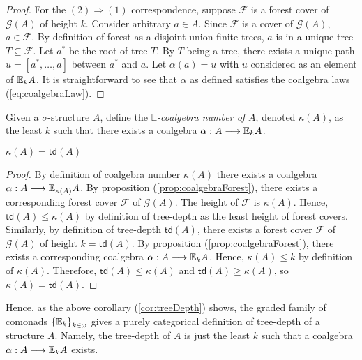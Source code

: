 \begin{prop}
\begin{proof}
For the $(2) \Rightarrow (1)$ correspondence, suppose $\mathcal{F}$ is a forest cover of $\mathcal{G}(A)$ of height $k$. Consider arbitrary $a \in A$. Since $\mathcal{F}$ is a cover of $\mathcal{G}(A)$, $a \in \mathcal{F}$. By definition of forest as a disjoint union finite trees, $a$ is in a unique tree $T \subseteq \mathcal{F}$. Let $a^{*}$ be the root of tree $T$. By $T$ being a tree, there exists a unique path $u = [a^{*},\dots,a]$ between $a^{*}$ and $a$. Let $\alpha(a) = u$ with $u$ considered as an element of ${\mathbb{E}_{k}A}$. It is straightforward to see that $\alpha$ as defined satisfies the coalgebra laws (\ref{eq:coalgebraLaw}). 
\end{proof}
\label{prop:coalgebraForest}
\begin{defn}
Given a $\sigma$-structure $A$, define the \textit{$\mathbb{E}$-coalgebra number of $A$}, denoted $\kappa(A)$, as the least $k$ such that there exists a coalgebra $\alpha:A \longrightarrow {\mathbb{E}_{k}A}$. 
\end{defn}
\begin{cor}
$\kappa(A) = \mathsf{td}(A)$
\begin{proof}
By definition of coalgebra number $\kappa(A)$ there exists a coalgebra $\alpha:A \longrightarrow {\mathbb{E}_{\kappa(A)}A}$. By proposition (\ref{prop:coalgebraForest}), there exists a corresponding forest cover $\mathcal{F}$ of $\mathcal{G}(A)$. The height of $\mathcal{F}$ is $\kappa(A)$. Hence, $\mathsf{td}(A) \leq \kappa(A)$ by definition of tree-depth as the least height of forest covers. Similarly, by definition of tree-depth $\mathsf{td}(A)$, there exists a forest cover $\mathcal{F}$ of $\mathcal{G}(A)$ of height $k = \mathsf{td}(A)$. By proposition (\ref{prop:coalgebraForest}), there exists a corresponding coalgebra $\alpha:A \longrightarrow {\mathbb{E}_{k}A}$. Hence, $\kappa(A) \leq k$ by definition of $\kappa(A)$. Therefore, $\mathsf{td}(A) \leq \kappa(A)$ and $\mathsf{td}(A) \geq \kappa(A)$, so $\kappa(A) = \mathsf{td}(A)$.      
\end{proof}
\label{cor:treeDepth}
\end{cor}
\end{prop}
Hence, as the above corollary (\ref{cor:treeDepth}) shows, the graded family of comonads $\{{\mathbb{E}_{k}\}}_{k \in \omega}$ gives a purely categorical definition of tree-depth of a structure $A$. Namely, the tree-depth of $A$ is just the least $k$ such that a coalgebra $\alpha:A \longrightarrow {\mathbb{E}_{k}A}$ exists. 
